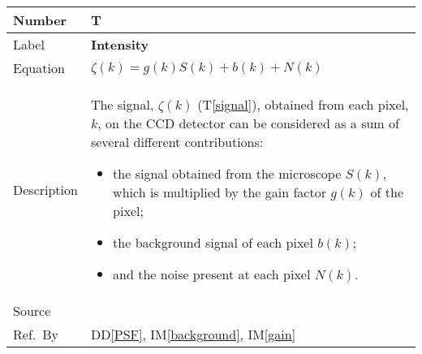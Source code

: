 \documentclass[12pt]{article}
\newcommand{\colAwidth}{0.13\textwidth}
\newcommand{\colBwidth}{0.82\textwidth}
\newcommand{\ddref}[1]{DD\ref{#1}}
\newcounter{theorynum} %
\newcommand{\tref}[1]{T\ref{#1}}
\newcommand{\iref}[1]{IM\ref{#1}}
\begin{document}
\noindent
\begin{minipage}{\textwidth}
	\renewcommand*{\arraystretch}{1.5}
	\begin{tabular}{| p{\colAwidth} | p{\colBwidth}|}
		  \hline
		  \rowcolor[gray]{0.9}
		  Number& T{theorynum}\thetheorynum \label{intensity}\\
		  \hline
		  Label&\bf Intensity \\
		  \hline
		  Equation& $\zeta(k) = g(k) S(k) + b(k) + N(k)$ \\
		  \hline
		  Description & The signal, $\zeta(k)$ (\tref{signal}), obtained from each pixel, $k$, on the CCD detector can be considered as a sum of several different contributions: 
		  \begin{itemize}
			\item the signal obtained from the microscope $S(k)$, which is multiplied by the gain factor $g(k)$ of the pixel; 
			\item the background signal of each pixel $b(k)$; 
			\item and the noise present at each pixel $N(k)$.
		  \end{itemize}\\
		  \hline
		  Source & \cite{zuo_electron_2000}\\
		  \hline
		  Ref.\ By & \ddref{PSF}, \iref{background}, \iref{gain} \\
		  \hline
	\end{tabular}
\end{minipage}\\

~\newline
\end{document}
